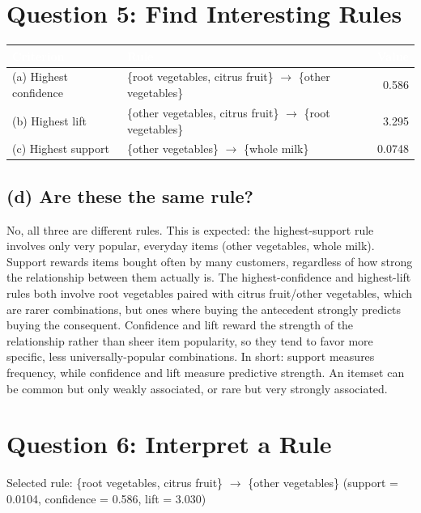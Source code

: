 \documentclass[11pt]{article}
\begin{document}
\section*{Question 5: Find Interesting Rules}

\begin{table}[H]
\centering
{}
\begin{tabular}{@{}llr@{}}
\toprule
\rowcolor{navy}
\textcolor{white}{Criterion} & \textcolor{white}{Rule} & \textcolor{white}{Value} \\ \midrule
(a) Highest confidence & \{root vegetables, citrus fruit\} $\rightarrow$ \{other vegetables\} & 0.586 \\
(b) Highest lift        & \{other vegetables, citrus fruit\} $\rightarrow$ \{root vegetables\} & 3.295 \\
(c) Highest support      & \{other vegetables\} $\rightarrow$ \{whole milk\}                    & 0.0748 \\
\bottomrule
\end{tabular}
\end{table}

\subsection*{(d) Are these the same rule?}
No, all three are different rules. This is expected: the highest-support rule involves only very popular, everyday items (other vegetables, whole milk). Support rewards items bought often by many customers, regardless of how strong the relationship between them actually is. The highest-confidence and highest-lift rules both involve root vegetables paired with citrus fruit/other vegetables, which are rarer combinations, but ones where buying the antecedent strongly predicts buying the consequent. Confidence and lift reward the strength of the relationship rather than sheer item popularity, so they tend to favor more specific, less universally-popular combinations. In short: support measures frequency, while confidence and lift measure predictive strength. An itemset can be common but only weakly associated, or rare but very strongly associated.

\section*{Question 6: Interpret a Rule}
Selected rule: \{root vegetables, citrus fruit\} $\rightarrow$ \{other vegetables\} (support = 0.0104, confidence = 0.586, lift = 3.030)
\end{document}
